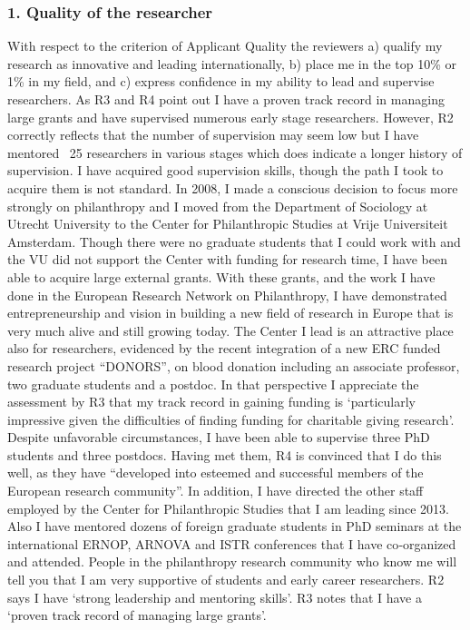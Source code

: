 \documentclass[twocolumn, serif, rga, numeric]{jote-article}
\begin{document}
\subsubsection{1. Quality of the researcher}
With respect to the criterion of Applicant Quality the reviewers a) qualify my research as innovative and leading internationally, b) place me in the top 10\% or 1\% in my field, and c) express confidence in my ability to lead and supervise researchers.
As R3 and R4 point out I have a proven track record in managing large grants and have supervised numerous early stage researchers. However, R2 correctly reflects that the number of supervision may seem low but I have mentored ~25 researchers in various stages which does indicate a longer history of supervision. I have acquired good supervision skills, though the path I took to acquire them is not standard.
In 2008, I made a conscious decision to focus more strongly on philanthropy and I moved from the Department of Sociology at Utrecht University to the Center for Philanthropic Studies at Vrije Universiteit Amsterdam. Though there were no graduate students that I could work with and the VU did not support the Center with funding for research time, I have been able to acquire large external grants. With these grants, and the work I have done in the European Research Network on Philanthropy, I have demonstrated entrepreneurship and vision in building a new field of research in Europe that is very much alive and still growing today. The Center I lead is an attractive place also for researchers, evidenced by the recent integration of a new ERC funded research project “DONORS”, on blood donation including an associate professor, two graduate students and a postdoc.
In that perspective I appreciate the assessment by R3 that my track record in gaining funding is ‘particularly impressive given the difficulties of finding funding for charitable giving research’. Despite unfavorable circumstances, I have been able to supervise three PhD students and three postdocs. Having met them, R4 is convinced that I do this well, as they have “developed into esteemed and successful members of the European research community”.
In addition, I have directed the other staff employed by the Center for Philanthropic Studies that I am leading since 2013. Also I have mentored dozens of foreign graduate students in PhD seminars at the international ERNOP, ARNOVA and ISTR conferences that I have co‐organized and attended. People in the philanthropy research community who know me will tell you that I am very supportive of students and early career researchers. R2 says I have ‘strong leadership and mentoring skills’. R3 notes that I have a ‘proven track record of managing large grants’.
\end{document}
